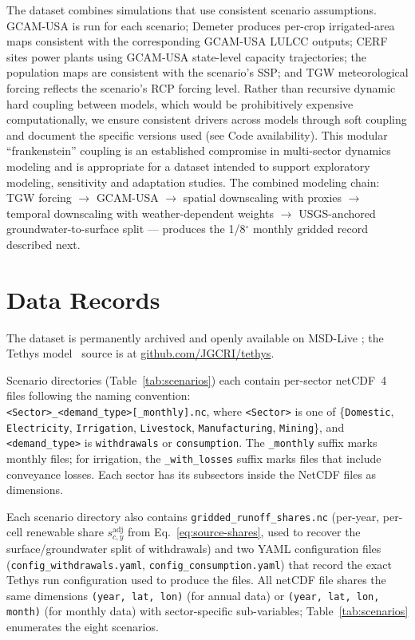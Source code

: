 \documentclass[fleqn,10pt]{wlscirep}
\begin{document}
The dataset combines simulations that use consistent scenario assumptions.  GCAM-USA is run for each scenario; Demeter produces per-crop irrigated-area maps consistent with the corresponding GCAM-USA LULCC outputs; CERF sites power plants using GCAM-USA state-level capacity trajectories; the population maps are consistent with the scenario's SSP; and TGW meteorological forcing reflects the scenario's RCP forcing level. Rather than recursive dynamic hard coupling between models, which would be prohibitively expensive computationally, we ensure consistent drivers across models through soft coupling and document the specific versions used (see Code availability). This modular ``frankenstein'' coupling is an established compromise in multi-sector dynamics modeling\cite{Khan2023, hess-17-4555-2013, hejazi2014, superwell, glory} and is appropriate for a dataset intended to support exploratory modeling, sensitivity and adaptation studies. The combined modeling chain: TGW forcing $\to$ GCAM-USA $\to$ spatial downscaling with proxies $\to$ temporal downscaling with weather-dependent weights $\to$ USGS-anchored groundwater-to-surface split --- produces the 1/8$^{\circ}$ monthly gridded record described next.

\section*{Data Records}

The dataset is permanently archived and openly available on MSD-Live \cite{bracken2026TethysDataSet}; the Tethys model~\cite{niazi_2026_20552731} source is at \href{https://github.com/JGCRI/tethys}{github.com/JGCRI/tethys}.

Scenario directories (Table~\ref{tab:scenarios}) each contain per-sector netCDF~4 files following the naming convention:\\\texttt{<Sector>\_<demand\_type>[\_monthly].nc}, where \texttt{<Sector>} is one of \{\texttt{Domestic}, \texttt{Electricity}, \texttt{Irrigation}, \texttt{Livestock}, \texttt{Manufacturing}, \texttt{Mining}\}, and \texttt{<demand\_type>} is \texttt{withdrawals} or \texttt{consumption}. The \texttt{\_monthly} suffix marks monthly files; for irrigation, the \texttt{\_with\_losses} suffix marks files that include conveyance losses. Each sector has its subsectors inside the NetCDF files as dimensions. 

Each scenario directory also contains \texttt{gridded\_runoff\_shares.nc} (per-year, per-cell renewable share $s^{\mathrm{adj}}_{c,y}$ from Eq.~\ref{eq:source-shares}, used to recover the surface/groundwater split of withdrawals) and two YAML configuration files (\texttt{config\_withdrawals.yaml}, \texttt{config\_consumption.yaml}) that record the exact Tethys run configuration used to produce the files. All netCDF file shares the same dimensions \texttt{(year, lat, lon)} (for annual data) or \texttt{(year, lat, lon, month)} (for monthly data) with sector-specific sub-variables; 
Table~\ref{tab:scenarios} enumerates the eight scenarios. 
\end{document}
